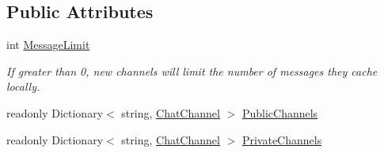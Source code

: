 \subsection*{Public Attributes}
\begin{DoxyCompactItemize}
\item 
int \hyperlink{class_exit_games_1_1_client_1_1_photon_1_1_chat_1_1_chat_client_a66e028cd73b441bbdd8d37ee0e2b1dee}{Message\+Limit}
\begin{DoxyCompactList}\small\item\em If greater than 0, new channels will limit the number of messages they cache locally. \end{DoxyCompactList}\item 
readonly Dictionary$<$ string, \hyperlink{class_exit_games_1_1_client_1_1_photon_1_1_chat_1_1_chat_channel}{Chat\+Channel} $>$ \hyperlink{class_exit_games_1_1_client_1_1_photon_1_1_chat_1_1_chat_client_aa3d4261b652969dd5f94971ca48f5a7e}{Public\+Channels}
\item 
readonly Dictionary$<$ string, \hyperlink{class_exit_games_1_1_client_1_1_photon_1_1_chat_1_1_chat_channel}{Chat\+Channel} $>$ \hyperlink{class_exit_games_1_1_client_1_1_photon_1_1_chat_1_1_chat_client_a25f9db0c022bb0feda81d31f43053a81}{Private\+Channels}
\end{DoxyCompactItemize}
